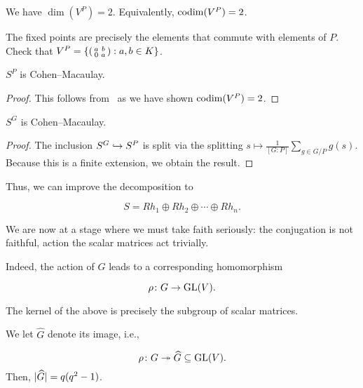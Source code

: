 \documentclass[12pt]{article}
\begin{document}
	\begin{lem} 
		We have $\dim(V^{P}) = 2$. Equivalently, $\operatorname{codim}(V^{P}) = 2$.
	\end{lem}
	\begin{sketch}
		The fixed points are precisely the elements that commute with elements of $P$.
		Check that $V^{P} = \left\{\left(\begin{smallmatrix} a & b \\ 0 & a \end{smallmatrix}\right) : a, b \in K\right\}$.
	\end{sketch}

	\begin{cor}
		$S^{P}$ is Cohen--Macaulay.
	\end{cor}
	\begin{proof} 
		This follows from~\Cite[Theorem 3.9.2]{CampbellWehlau:ModularInvariantTheory} as we have shown $\operatorname{codim}(V^{P}) = 2$.
	\end{proof}

	\begin{cor}
		$S^{G}$ is Cohen--Macaulay.
	\end{cor}
	\begin{proof} 
		The inclusion $S^{G} \hookrightarrow S^{P}$ is split via the splitting $s \mapsto \frac{1}{[G : P]} \sum\limits_{g \in G/P} g(s)$. 
		Because this is a finite extension, we obtain the result.
	\end{proof}

	Thus, we can improve the decomposition to
	\begin{tcolorbox}
		\begin{equation*} 
			S = R h_{1} \oplus R h_{2} \oplus \cdots \oplus R h_{n}.
		\end{equation*}
	\end{tcolorbox}

	We are now at a stage where we must take faith seriously:
	the conjugation is not faithful, action the scalar matrices act trivially. 

	Indeed, the action of $G$ leads to a corresponding homomorphism
	\begin{tcolorbox}
		\begin{equation*} 
			\rho \colon G \to \operatorname{GL}(V).
		\end{equation*}
	\end{tcolorbox}
	The kernel of the above is precisely the subgroup of scalar matrices.

	We let $\widehat{G}$ denote its image, i.e.,
	\begin{tcolorbox}
		\begin{equation*} 
			\rho \colon G \twoheadrightarrow \widehat{G} \subseteq \operatorname{GL}(V).
		\end{equation*}
		Then, ${\lvert \widehat{G} \lvert} = q(q^{2} - 1)$.
	\end{tcolorbox}
\end{document}
